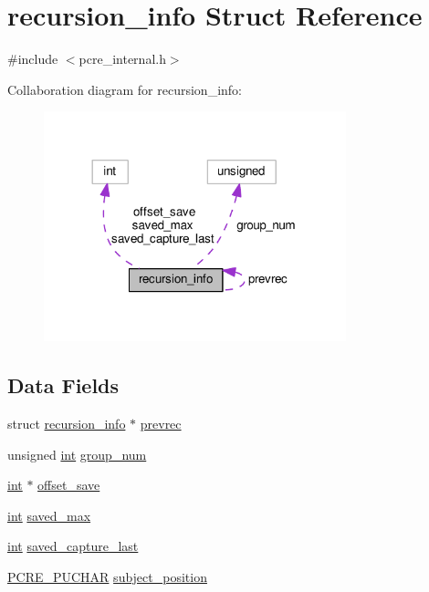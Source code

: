 \hypertarget{structrecursion__info}{}\section{recursion\+\_\+info Struct Reference}
\label{structrecursion__info}


{\ttfamily \#include $<$pcre\+\_\+internal.\+h$>$}



Collaboration diagram for recursion\+\_\+info\+:
\nopagebreak
\begin{figure}[H]
\begin{center}
\leavevmode
\includegraphics[width=248pt]{structrecursion__info__coll__graph}
\end{center}
\end{figure}
\subsection*{Data Fields}
\begin{DoxyCompactItemize}
\item 
struct \hyperlink{structrecursion__info}{recursion\+\_\+info} $\ast$ \hyperlink{structrecursion__info_a025c08cb7349ee9247c2da7a7d232887}{prevrec}
\item 
unsigned \hyperlink{pcre_8txt_a42dfa4ff673c82d8efe7144098fbc198}{int} \hyperlink{structrecursion__info_ac9973b335478264612581f190428cda1}{group\+\_\+num}
\item 
\hyperlink{pcre_8txt_a42dfa4ff673c82d8efe7144098fbc198}{int} $\ast$ \hyperlink{structrecursion__info_ac95484f6fae006a0311ebbcced334428}{offset\+\_\+save}
\item 
\hyperlink{pcre_8txt_a42dfa4ff673c82d8efe7144098fbc198}{int} \hyperlink{structrecursion__info_a242319efb0eeeacbec0b5e0ed7a6be4d}{saved\+\_\+max}
\item 
\hyperlink{pcre_8txt_a42dfa4ff673c82d8efe7144098fbc198}{int} \hyperlink{structrecursion__info_a06e8fdf78c7e319a84c7b4a3fbd50b83}{saved\+\_\+capture\+\_\+last}
\item 
\hyperlink{pcre__internal_8h_a142c7c692c1f94083b0ad52e0520e900}{P\+C\+R\+E\+\_\+\+P\+U\+C\+H\+AR} \hyperlink{structrecursion__info_a8ee1dc479817dee223f0abcf618648c6}{subject\+\_\+position}
\end{DoxyCompactItemize}


